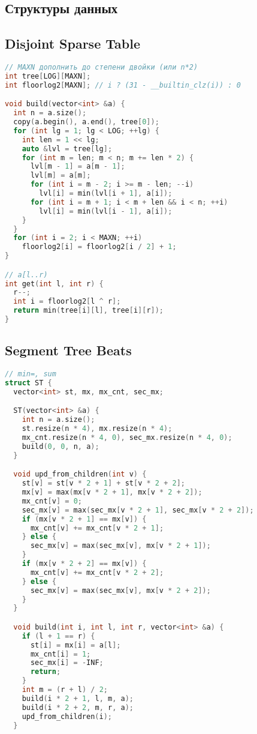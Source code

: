 \documentclass[9pt,a4paper,landscape,twosided]{extarticle}
\begin{document}
\begin{multicols*}{3}
\section{Структуры данных}

\subsection{Disjoint Sparse Table}
\begin{lstlisting}[language=C++]
// MAXN дополнить до степени двойки (или n*2)
int tree[LOG][MAXN];
int floorlog2[MAXN]; // i ? (31 - __builtin_clz(i)) : 0

void build(vector<int> &a) {
  int n = a.size();
  copy(a.begin(), a.end(), tree[0]);
  for (int lg = 1; lg < LOG; ++lg) {
    int len = 1 << lg;
    auto &lvl = tree[lg];
    for (int m = len; m < n; m += len * 2) {
      lvl[m - 1] = a[m - 1];
      lvl[m] = a[m];
      for (int i = m - 2; i >= m - len; --i)
        lvl[i] = min(lvl[i + 1], a[i]);
      for (int i = m + 1; i < m + len && i < n; ++i)
        lvl[i] = min(lvl[i - 1], a[i]);
    }
  }
  for (int i = 2; i < MAXN; ++i)
    floorlog2[i] = floorlog2[i / 2] + 1;
}

// a[l..r)
int get(int l, int r) {
  r--;
  int i = floorlog2[l ^ r];
  return min(tree[i][l], tree[i][r]);
}

\end{lstlisting}

\subsection{Segment Tree Beats}
\begin{lstlisting}[language=C++]
// min=, sum
struct ST {
  vector<int> st, mx, mx_cnt, sec_mx;

  ST(vector<int> &a) {
    int n = a.size();
    st.resize(n * 4), mx.resize(n * 4);
    mx_cnt.resize(n * 4, 0), sec_mx.resize(n * 4, 0);
    build(0, 0, n, a);
  }

  void upd_from_children(int v) {
    st[v] = st[v * 2 + 1] + st[v * 2 + 2];
    mx[v] = max(mx[v * 2 + 1], mx[v * 2 + 2]);
    mx_cnt[v] = 0;
    sec_mx[v] = max(sec_mx[v * 2 + 1], sec_mx[v * 2 + 2]);
    if (mx[v * 2 + 1] == mx[v]) {
      mx_cnt[v] += mx_cnt[v * 2 + 1];
    } else {
      sec_mx[v] = max(sec_mx[v], mx[v * 2 + 1]);
    }
    if (mx[v * 2 + 2] == mx[v]) {
      mx_cnt[v] += mx_cnt[v * 2 + 2];
    } else {
      sec_mx[v] = max(sec_mx[v], mx[v * 2 + 2]);
    }
  }

  void build(int i, int l, int r, vector<int> &a) {
    if (l + 1 == r) {
      st[i] = mx[i] = a[l];
      mx_cnt[i] = 1;
      sec_mx[i] = -INF;
      return;
    }
    int m = (r + l) / 2;
    build(i * 2 + 1, l, m, a);
    build(i * 2 + 2, m, r, a);
    upd_from_children(i);
  }


\end{lstlisting}
\end{multicols*}
\end{document}
